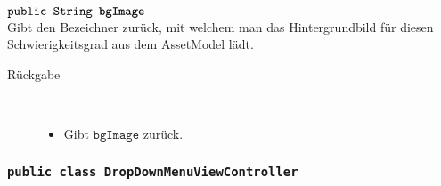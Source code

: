 \begin{description}
		\item $\texttt{public String \textbf{bgImage}}$ \\ Gibt den Bezeichner zurück, mit welchem man das Hintergrundbild für diesen Schwierigkeitsgrad aus dem AssetModel lädt.
		\begin{description}
			\item[Rückgabe] \hfill \\
			\vspace{-.8cm}
			\begin{itemize}
				\item Gibt $\texttt{bgImage}$ zurück.
			\end{itemize}
			\end{description}

		
	\end{description}
	
	
\subsubsection{\normalfont \texttt{public class \textbf{DropDownMenuViewController}}}

